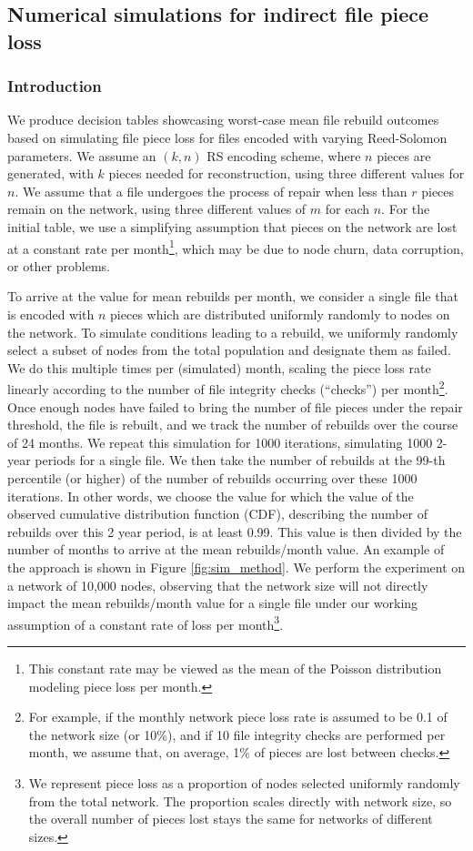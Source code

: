 
\subsection{Numerical simulations for indirect file piece loss}
\subsubsection{Introduction}
We produce decision tables showcasing worst-case mean file rebuild outcomes based on simulating file piece loss for files encoded with varying Reed-Solomon parameters. 
We assume an $(k,n)$ RS encoding scheme, where $n$ pieces are generated, with 
$k$ pieces needed for reconstruction, using three different values for $n$.
We assume that a file undergoes the process of repair when less than $r$ pieces remain on the network, using three different values of $m$ for each $n$.
For the initial table, we use a simplifying assumption that pieces on the network are lost at a constant rate per month\footnote{This constant rate may be viewed as the mean of the Poisson distribution modeling piece loss per month.}, which may be due to node churn, data corruption, or other problems.


To arrive at the value for mean rebuilds per month, we consider a single file that is encoded with $n$ pieces which are distributed uniformly randomly to nodes on the network. To simulate conditions leading to a rebuild, we uniformly randomly select a subset of nodes from the total population and designate them as failed. We do this multiple times per (simulated) month, scaling the piece loss rate linearly according to the number of file integrity checks (``checks'') per month\footnote{
For example, if the monthly network piece loss rate is assumed to be 0.1 of the network size (or 10\%), and if 10 file integrity checks are performed per month, we assume that, on average, 1\% of pieces are lost between checks.}. 
Once enough nodes have failed to bring the number of file pieces under the repair threshold, the file is rebuilt, and we track the number of rebuilds over the course of 24 months.
We repeat this simulation for 1000 iterations, simulating 1000 2-year periods for a single file. We then take the number of rebuilds at the 99-th percentile (or higher) of the number of rebuilds occurring over these 1000 iterations. In other words, we choose the value for which the value of the observed cumulative distribution function (CDF), describing the number of rebuilds over this 2 year period, is at least 0.99. This value is then divided by the number of months to arrive at the mean rebuilds/month value. An example of the approach is shown in Figure \ref{fig:sim_method}. We perform the experiment on a network of 10,000 nodes, observing that the network size will not directly impact the mean rebuilds/month value for a single file under our working assumption of a constant rate of loss per month\footnote{We represent piece loss as a proportion of nodes selected uniformly randomly from the total network. The proportion scales directly with network size, so the overall number of pieces lost stays the same for networks of different sizes.}.

